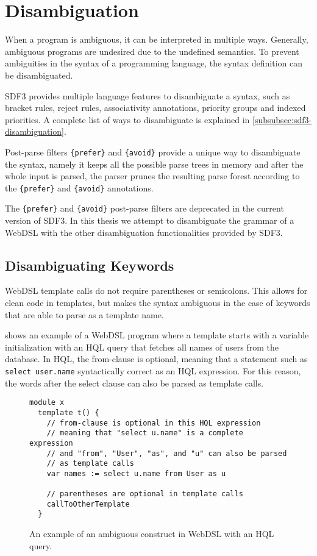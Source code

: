   \section{\label{sec:webdsl-sdf3-disambiguation}Disambiguation}
  
    When a program is ambiguous, it can be interpreted in multiple ways. Generally, ambiguous programs are undesired due to the undefined semantics. To prevent ambiguities in the syntax of a programming language, the syntax definition can be disambiguated.

    SDF3 provides multiple language features to disambiguate a syntax, such as bracket rules, reject rules, associativity annotations, priority groups and indexed priorities. A complete list of ways to disambiguate is explained in \cref{subsubsec:sdf3-disambiguation}.

    Post-parse filters \texttt{\{prefer\}} and \texttt{\{avoid\}} provide a unique way to disambiguate the syntax, namely it keeps all the possible parse trees in memory and after the whole input is parsed, the parser prunes the resulting parse forest according to the \texttt{\{prefer\}} and \texttt{\{avoid\}} annotations.
    
    The \texttt{\{prefer\}} and \texttt{\{avoid\}} post-parse filters are deprecated in the current version of SDF3. In this thesis we attempt to disambiguate the grammar of a WebDSL with the other disambiguation functionalities provided by SDF3.

    \subsection{Disambiguating Keywords}

      WebDSL template calls do not require parentheses or semicolons. This allows for clean code in templates, but makes the syntax ambiguous in the case of keywords that are able to parse as a template name.
      
       shows an example of a WebDSL program where a template starts with a variable initialization with an HQL query that fetches all names of users from the database. In HQL, the from-clause is optional, meaning that a statement such as \texttt{select user.name} syntactically correct as an HQL expression. For this reason, the words after the select clause can also be parsed as template calls.

      \begin{figure}
        \begin{verbatim}
module x
  template t() {
    // from-clause is optional in this HQL expression
    // meaning that "select u.name" is a complete expression
    // and "from", "User", "as", and "u" can also be parsed
    // as template calls
    var names := select u.name from User as u

    // parentheses are optional in template calls
    callToOtherTemplate
  }
        \end{verbatim}
        \caption{\label{fig:sdf3-keywords-ambiguous}An example of an ambiguous construct in WebDSL with an HQL query.}
      \end{figure}

